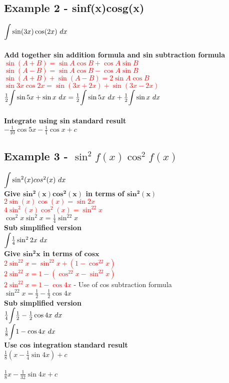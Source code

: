 \documentclass{article}[18pt]
\begin{document}
\subsection{Example 2 - sinf(x)cosg(x)}
$\mathlarger{\int}\sin(3x)\cos(2x) \ dx$\\
\\
\textbf{Add together sin addition formula and sin subtraction formula}\\
\textcolor{red}{$\sin(A+B)=\sin A\cos B+\cos A\sin B$}\\
\textcolor{red}{$\sin(A-B)=\sin A\cos B-\cos A\sin B$}\\
\textcolor{red}{$\sin(A+B)+\sin(A-B)=2\sin A\cos B$}\\
\textcolor{red}{$\sin 3x\cos 2x=\sin(3x+2x)+\sin(3x-2x)$}\\
$\frac{1}{2}\mathlarger{\int}\sin5x+\sin x \ dx=\frac{1}{2}\mathlarger{\int}\sin5x \ dx+\frac{1}{2}\mathlarger{\int}\sin x \ dx$\\
\\
\textbf{Integrate using sin standard result}\\
$-\frac{1}{10}\cos5x-\frac{1}{1}\cos x+c$
\subsection{Example 3 - $\sin^2f(x)\cos^2f(x)$}
$\mathlarger{\int}\sin^2(x)cos^2(x) \ dx$\\
\textbf{Give $\mathbf{sin^2(x)cos^2(x)}$ in terms of $\mathbf{sin^2(x)}$}\\
\textcolor{red}{$2\sin(x)\cos(x)=\sin2x$}\\
\textcolor{red}{$4\sin^2(x)\cos^2(x)=\sin^22x$}\\
$\cos^2x\sin^2x=\frac{1}{4}\sin^22x$\\
\textbf{Sub simplified version}\\
$\mathlarger{\int}\frac{1}{4}\sin^22x \ dx$\\
\textbf{Give $\mathbf{sin^2x}$ in terms of $\mathbf{cosx}$}\\
\textcolor{red}{$2\sin^22x=\sin^22x+(1-\cos^22x)$}\\
\textcolor{red}{$2\sin^22x=1-(\cos^22x-\sin^22x)$}\\
\textcolor{red}{$2\sin^22x=1-\cos4x$} - Use of cos subtraction formula\\
$\sin^22x=\frac{1}{2}-\frac{1}{2}\cos4x$\\
\textbf{Sub simplified version}\\
$\frac{1}{4}\mathlarger{\int}\frac{1}{2}-\frac{1}{2}\cos4x \ dx$\\
$\frac{1}{8}\mathlarger{\int}1-\cos4x \ dx$\\
\textbf{Use cos integration standard result}\\
$\frac{1}{8}(x-\frac{1}{4}\sin4x)+c$\\
\\
$\frac{1}{8}x-\frac{1}{32}\sin4x+c$\\
\newpage
\end{document}

